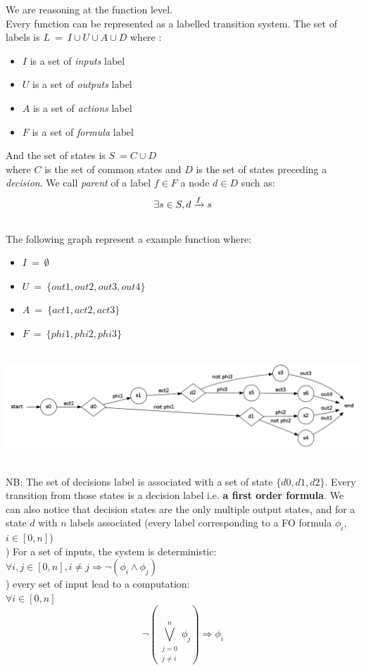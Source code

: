 \documentclass[a4paper]{report}
\begin{document}
We are reasoning at the function level.\\
Every function can be represented as a labelled transition system. The set of labels is $L\ =\ I \cup U \cup A \cup D$ where :\\
\begin{itemize}
\item $I$ is a set of \textit{inputs} label
\item $U$ is a set of \textit{outputs} label
\item $A$ is a set of \textit{actions} label
\item $F$ is a set of \textit{formula} label
\end{itemize}
And the set of states is $S\ = C \cup D$\\
where $C$ is the set of common states and $D$ is the set of states preceding a \textit{decision}.
We call \textit{parent} of a label $f \in F$ a node $d \in D$ such as:\\
\[
\exists s \in S, 
d \xrightarrow{f} s\\
\]
$ $\\
\newline
The following graph represent a example function where:
\begin{itemize}
\item $I\ =\ \emptyset$
\item $U\ =\ \{out1, out2, out3, out4\}$
\item $A\ =\ \{act1, act2, act3\}$
\item $F\ =\ \{phi1, phi2, phi3\}$
\end{itemize}
$ $\\
\includegraphics[scale=0.3]{../graphviz/LTSExample.png}
$ $\\
\newline

NB: The set of decisions label is associated with a set of state $\{d0, d1, d2\}$. Every transition from those states is a decision label i.e. \textbf{a first order formula}. We can also notice that decision states are the only multiple output states, and for a state $d$ with $n$ labels associated (every label corresponding to a FO formula $\phi_i$, $i\in[0, n]$)\\
) For a set of inputs, the system is deterministic:\\
$\forall i, j \in [0, n], i \neq j \Rightarrow \neg (\phi_i \wedge \phi_j)$\\
) every set of input lead to a computation:\\
$\forall i \in [0, n] $\\
\[\displaystyle \neg (\bigvee_{\substack{j=0 \\ j \neq i}}^{n} \phi_j) \Rightarrow \phi_i \]
\end{document}
